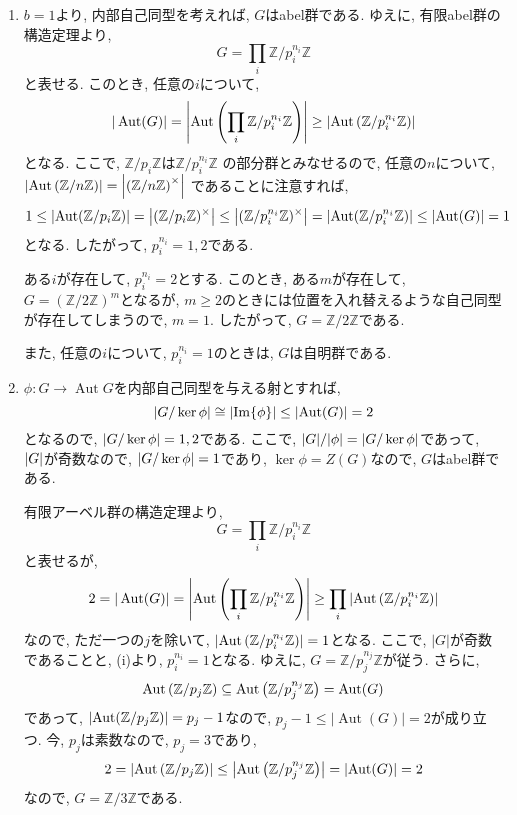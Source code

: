 \documentclass[dvipdfmx]{jsarticle}
\theoremstyle{JapanesePropositionStyle}
\DeclareMathOperator{\Aut}{Aut}
\begin{document}
    \begin{enumerate}[label=(\roman*)]
        \item $b = 1$より, 内部自己同型を考えれば, $G$はabel群である.
        ゆえに, 有限abel群の構造定理より, 
        \[
            G = \prod_i \mathbb{Z}/p^{n_i}_i \mathbb{Z}    
        \]
        と表せる.
        このとき, 任意の$i$について, 
        \[
            |\Aut(G)| = \abs{\Aut\qty(\prod_i \mathbb{Z}/p^{n_i}_i \mathbb{Z})} \geq \abs{\Aut\qty(\mathbb{Z}/p^{n_i}_i\mathbb{Z})}    
        \]
        となる.
        ここで, $\mathbb{Z}/p_i\mathbb{Z}$は$\mathbb{Z}/p_i^{n_i}\mathbb{Z}$
        の部分群とみなせるので, 任意の$n$について, 
        $\abs{\Aut{\qty(\mathbb{Z}/n\mathbb{Z})}} = \abs{\qty(\mathbb{Z}/n\mathbb{Z})^\times}$
        であることに注意すれば, 
        \[
            1 \leq \abs{\Aut(\mathbb{Z}/p_i\mathbb{Z})} = \abs{(\mathbb{Z}/p_i\mathbb{Z})^\times} 
            \leq \abs{(\mathbb{Z}/p_i^{n_i}\mathbb{Z})^\times} = \abs{\Aut(\mathbb{Z}/p_i^{n_i}\mathbb{Z})} \leq \abs{\Aut(G)} = 1
        \] 
        となる.
        したがって, $p_i^{n_i} = 1, 2$である.


        ある$i$が存在して, $p_i^{n_i} = 2$とする.
        このとき, ある$m$が存在して, $G = (\mathbb{Z}/2\mathbb{Z})^m$となるが, 
        $m \geq 2$のときには位置を入れ替えるような自己同型が存在してしまうので, $m = 1$.
        したがって, $G = \mathbb{Z}/2\mathbb{Z}$である.

        また, 任意の$i$について, $p_i^{n_i} = 1$のときは, $G$は自明群である. 

        \item $\phi: G  \to \Aut{G}$を内部自己同型を与える射とすれば, 
        \[
            \abs{G/\ker{\phi}} \cong \abs{\Im{\phi}} \leq \abs{\Aut(G)} = 2  
        \]
        となるので, $\abs{G/\ker{\phi}} = 1, 2$である.
        ここで, $\abs{G}/ \abs{\phi} = \abs{G/\ker{\phi}}$であって, $\abs{G}$が奇数なので, 
        $\abs{G/\ker{\phi}} = 1$であり, $\ker{\phi} = Z(G)$なので, $G$はabel群である.

        有限アーベル群の構造定理より, 
        \[
            G =    \prod_i \mathbb{Z}/p^{n_i}_i \mathbb{Z} 
        \]
        と表せるが, 
        \[
            2 = |\Aut(G)| = \abs{\Aut\qty(\prod_i \mathbb{Z}/p^{n_i}_i \mathbb{Z})} \geq \prod_i\abs{\Aut\qty(\mathbb{Z}/p^{n_i}_i\mathbb{Z})}    
        \]
        なので, ただ一つの$j$を除いて, $\abs{\Aut\qty(\mathbb{Z}/p_i^{n_i}\mathbb{Z})} = 1$となる.
        ここで, $|G|$が奇数であることと, (i)より, $p^{n_i}_i = 1$となる.
        ゆえに, $G = \mathbb{Z}/p^{n_j}_j \mathbb{Z}$が従う.
        さらに, 
        \[
            \Aut\qty(\mathbb{Z}/p_j\mathbb{Z}) \subseteq \Aut\qty(\mathbb{Z}/p^{n_j}_j\mathbb{Z}) = \Aut(G)    
        \]
        であって, $\abs{\Aut(\mathbb{Z}/p_j\mathbb{Z})} = p_j-1$なので, $p_j - 1 \leq |\Aut(G)| = 2$が成り立つ.
        今, $p_j$は素数なので, $p_j = 3$であり, 
        \[
            2 = \abs{\Aut\qty(\mathbb{Z}/p_j\mathbb{Z})} \leq \abs{\Aut\qty(\mathbb{Z}/p^{n_j}_j\mathbb{Z})} = \abs{\Aut(G)} = 2        
        \]
        なので, $G = \mathbb{Z}/3\mathbb{Z}$である.
    \end{enumerate}
\end{document}
